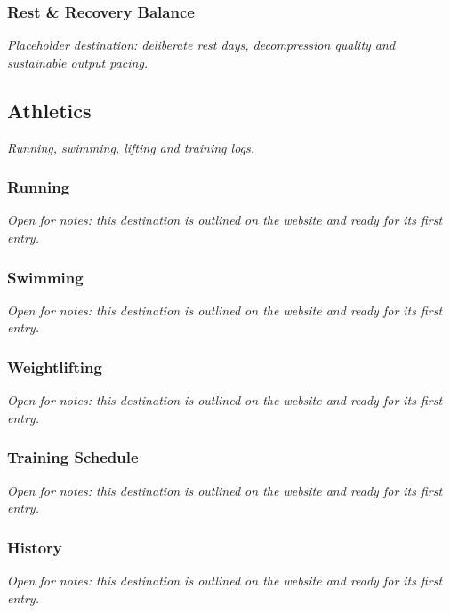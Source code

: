 \documentclass{article}
\begin{document}
\subsubsection{Rest \& Recovery Balance}\label{sec:rest-and-recovery-balance}
\textit{Placeholder destination: deliberate rest days, decompression quality and sustainable output pacing.}

\subsection{Athletics}\label{sec:athletics}
\textit{Running, swimming, lifting and training logs.}

\subsubsection{Running}\label{sec:running}
\textit{Open for notes: this destination is outlined on the website and ready for its first entry.}

\subsubsection{Swimming}\label{sec:swimming}
\textit{Open for notes: this destination is outlined on the website and ready for its first entry.}

\subsubsection{Weightlifting}\label{sec:weightlifting}
\textit{Open for notes: this destination is outlined on the website and ready for its first entry.}

\subsubsection{Training Schedule}\label{sec:training-schedule}
\textit{Open for notes: this destination is outlined on the website and ready for its first entry.}

\subsubsection{History}\label{sec:athletics-history}
\textit{Open for notes: this destination is outlined on the website and ready for its first entry.}
\end{document}
